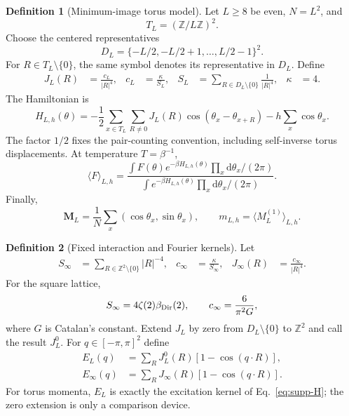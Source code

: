 \documentclass[aps,prb,preprint,notitlepage,groupedaddress,amsmath,amssymb,
               superscriptaddress,nofootinbib,floatfix]{revtex4-2}
\theoremstyle{definition}
\newtheorem{definition}{Definition}
\theoremstyle{plain}
\newcommand{\dd}{\mathrm{d}}
\begin{document}
\begin{definition}[Minimum-image torus model]
Let $L\ge8$ be even, $N=L^2$, and
\begin{equation}
 T_L=(\mathbb Z/L\mathbb Z)^2.
\end{equation}
Choose the centered representatives
\begin{equation}
 D_L=\{-L/2,-L/2+1,\ldots,L/2-1\}^2.
\end{equation}
For $R\in T_L\setminus\{0\}$, the same symbol denotes its representative
in $D_L$.  Define
\begin{align}
 J_L(R)&=\frac{c_L}{|R|^4},&
 c_L&=\frac{\kappa}{S_L},&
 S_L&=\sum_{R\in D_L\setminus\{0\}}\frac1{|R|^4},&
 \kappa&=4.
 \label{eq:supp-coupling}
\end{align}
The Hamiltonian is
\begin{equation}
 H_{L,h}(\theta)=
 -\frac12\sum_{x\in T_L}\sum_{R\ne0}
 J_L(R)\cos(\theta_x-\theta_{x+R})
 -h\sum_x\cos\theta_x .
 \label{eq:supp-H}
\end{equation}
The factor $1/2$ fixes the pair-counting convention, including
self-inverse torus displacements.  At temperature $T=\beta^{-1}$,
\begin{equation}
 \langle F\rangle_{L,h}
 =
 \frac{\int F(\theta)e^{-\beta H_{L,h}(\theta)}
 \prod_x\dd\theta_x/(2\pi)}
 {\int e^{-\beta H_{L,h}(\theta)}
 \prod_x\dd\theta_x/(2\pi)}.
 \label{eq:supp-gibbs}
\end{equation}
Finally,
\begin{equation}
 \bm M_L=\frac1N\sum_x(\cos\theta_x,\sin\theta_x),\qquad
 m_{L,h}=\langle M_L^{(1)}\rangle_{L,h}.
\end{equation}
\end{definition}

\begin{definition}[Fixed interaction and Fourier kernels]
Let
\begin{align}
 S_\infty&=\sum_{R\in\mathbb Z^2\setminus\{0\}}|R|^{-4},&
 c_\infty&=\frac{\kappa}{S_\infty},&
 J_\infty(R)&=\frac{c_\infty}{|R|^4}.
\end{align}
For the square lattice,
\begin{equation}
 S_\infty=4\zeta(2)\beta_{\rm Dir}(2),\qquad
 c_\infty=\frac6{\pi^2G},
\end{equation}
where $G$ is Catalan's constant.  Extend $J_L$ by zero from
$D_L\setminus\{0\}$ to $\mathbb Z^2$ and call the result $J_L^0$.
For $q\in[-\pi,\pi]^2$ define
\begin{align}
 E_L(q)&=\sum_RJ_L^0(R)[1-\cos(q\cdot R)],\\
 E_\infty(q)&=\sum_RJ_\infty(R)[1-\cos(q\cdot R)].
 \label{eq:supp-kernels}
\end{align}
For torus momenta, $E_L$ is exactly the excitation kernel of
Eq.~\eqref{eq:supp-H}; the zero extension is only a comparison device.
\end{definition}
\end{document}
